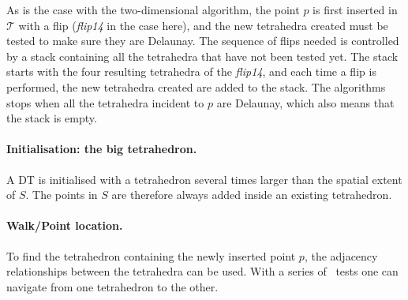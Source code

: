 As is the case with the two-dimensional algorithm, the point $p$ is first inserted in $\mathcal{T}$ with a flip (\emph{flip14} in the case here), 
and the new tetrahedra created must be tested to make sure they are Delaunay. 
The sequence of flips needed is controlled by a stack containing all the tetrahedra that have not been tested yet. 
The stack starts with the four resulting tetrahedra of the \emph{flip14}, and each time a flip is performed, the new tetrahedra created are added to the stack. 
The algorithms stops when all the tetrahedra incident to $p$ are Delaunay, which also means that the stack is empty.


\paragraph{Initialisation: the big tetrahedron.}
A DT is initialised with a tetrahedron several times larger than the spatial extent of $S$.
The points in $S$ are therefore always added inside an existing tetrahedron. 

\paragraph{Walk/Point location.}
To find the tetrahedron containing the newly inserted point $p$, the adjacency relationships between the tetrahedra can be used. 
With a series of \Orient\ tests one can navigate from one tetrahedron to the other.

